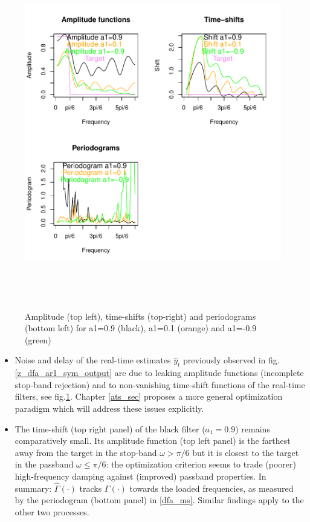 \documentclass[a4paper]{book}
\begin{document}
\begin{enumerate}
\begin{Schunk}
\begin{Sinput}
\end{Sinput}
\end{Schunk}
\begin{figure}[H]\begin{center}\includegraphics[height=6in, width=6in]{z_dfa_ar1_amp_shift.pdf}\caption{Amplitude (top left), time-shifts (top-right) and periodograms (bottom left) for
a1=0.9 (black), a1=0.1 (orange) and a1=-0.9 (green)\label{z_dfa_ar1_amp_shift}}\end{center}\end{figure}\begin{itemize}
\item Noise and delay of the real-time estimates $\hat{y}_t$ previously observed in fig.\ref{z_dfa_ar1_sym_output} are due to leaking amplitude functions (incomplete stop-band rejection) and to non-vanishing time-shift functions of the real-time filters, see fig.\ref{z_dfa_ar1_amp_shift}. Chapter \ref{ats_sec} proposes a more general optimization paradigm which will address these issues explicitly.
\item The time-shift (top right panel) of the black filter ($a_1=0.9$) remains comparatively small. Its amplitude function (top left panel) 
is the farthest away from the target in the stop-band $\omega>\pi/6$ but it is closest
to the target in the passband $\omega\leq\pi/6$: the optimization criterion seems to trade (poorer) high-frequency damping against (improved) passband properties. In summary: $\hat{\Gamma}(\cdot)$ tracks $\Gamma(\cdot)$ towards the loaded frequencies, as measured by the periodogram (bottom panel) in \ref{dfa_ms}. Similar findings apply to the other two processes.
\end{itemize}
\end{enumerate}
\end{document}
